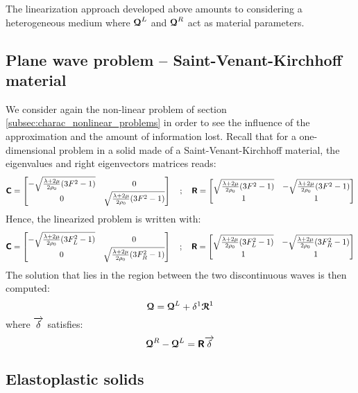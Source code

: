 \begin{remark}
  The linearization approach developed above amounts to considering a heterogeneous medium where ${\boldsymbol{\mathcal{Q}}}^{L}$ and ${\boldsymbol{\mathcal{Q}}}^R$ act as material parameters.
\end{remark}

\subsection{Plane wave problem -- Saint-Venant-Kirchhoff material}
We consider again the non-linear problem of section \ref{subsec:charac_nonlinear_problems} in order to see the influence of the approximation and the amount of information lost. Recall that for a one-dimensional problem in a solid made of a Saint-Venant-Kirchhoff material, the eigenvalues and right eigenvectors matrices reads:
\begin{equation}
  \label{eq:SVK_matrices}
  \boldsymbol{\mathsf{C}} = \left[\begin{matrix}-\sqrt{\frac{\lambda + 2\mu}{2\rho_0}(3F^2-1)} & 0 \\ 0 & \sqrt{\frac{\lambda + 2\mu}{2\rho_0}(3F^2-1)}\end{matrix}\right] \quad ; \quad \boldsymbol{\mathsf{R}} = \left[\begin{matrix}\sqrt{\frac{\lambda + 2\mu}{2\rho_0}(3F^2-1)} & -\sqrt{\frac{\lambda + 2\mu}{2\rho_0}(3F^2-1)}\\ 1&1\end{matrix}\right]
\end{equation}
Hence, the linearized problem is written with:
\begin{equation}
  \label{eq:SVK_matrices_linear}
  \boldsymbol{\mathsf{C}} = \left[\begin{matrix}-\sqrt{\frac{\lambda + 2\mu}{2\rho_0}(3F_L^2-1)} & 0 \\ 0 & \sqrt{\frac{\lambda + 2\mu}{2\rho_0}(3F_R^2-1)}\end{matrix}\right] \quad ; \quad \boldsymbol{\mathsf{R}} = \left[\begin{matrix}\sqrt{\frac{\lambda + 2\mu}{2\rho_0}(3F_L^2-1)} & -\sqrt{\frac{\lambda + 2\mu}{2\rho_0}(3F_R^2-1)}\\ 1&1\end{matrix}\right]
\end{equation}
The solution that lies in the region between the two discontinuous waves is then computed:
\begin{equation*}
  {\boldsymbol{\mathcal{Q}}}={\boldsymbol{\mathcal{Q}}}^L + \delta^1 {\boldsymbol{\mathcal{R}}}^1
\end{equation*}
where ${\overrightarrow{\delta}}$ satisfies:
\begin{equation*}
  {\boldsymbol{\mathcal{Q}}}^R-{\boldsymbol{\mathcal{Q}}}^L = \boldsymbol{\mathsf{R}} {\overrightarrow{\delta}}
\end{equation*}
\subsection{Elastoplastic solids}

